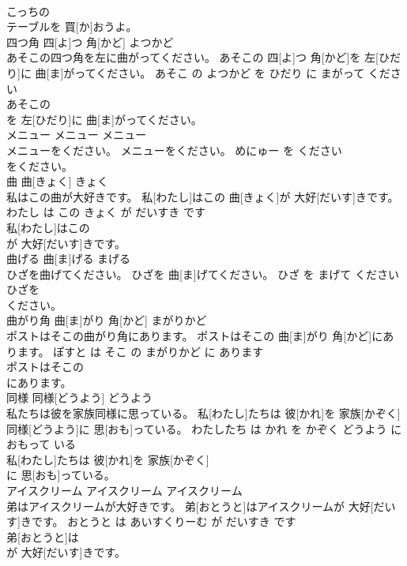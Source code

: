 \documentclass[8pt]{extreport}
\begin{document}
\begin{CJK}{UTF8}{min}
\\	こっちの
\\	テーブルを 買[か]おうよ。			
\\	四つ角	四[よ]つ 角[かど]	よつかど	
\\	あそこの四つ角を左に曲がってください。	あそこの 四[よ]つ 角[かど]を 左[ひだり]に 曲[ま]がってください。	あそこ の よつかど を ひだり に まがって ください	
\\	あそこの
\\	を 左[ひだり]に 曲[ま]がってください。			
\\	メニュー	メニュー	メニュー	
\\	メニューをください。	メニューをください。	めにゅー を ください	
\\	をください。			
\\	曲	曲[きょく]	きょく	
\\	私はこの曲が大好きです。	私[わたし]はこの 曲[きょく]が 大好[だいす]きです。	わたし は この きょく が だいすき です	
\\	私[わたし]はこの
\\	が 大好[だいす]きです。			
\\	曲げる	曲[ま]げる	まげる	
\\	ひざを曲げてください。	ひざを 曲[ま]げてください。	ひざ を まげて ください	
\\	ひざを
\\	ください。			
\\	曲がり角	曲[ま]がり 角[かど]	まがりかど	
\\	ポストはそこの曲がり角にあります。	ポストはそこの 曲[ま]がり 角[かど]にあります。	ぽすと は そこ の まがりかど に あります	
\\	ポストはそこの
\\	にあります。			
\\	同様	同様[どうよう]	どうよう	
\\	私たちは彼を家族同様に思っている。	私[わたし]たちは 彼[かれ]を 家族[かぞく] 同様[どうよう]に 思[おも]っている。	わたしたち は かれ を かぞく どうよう に おもって いる	
\\	私[わたし]たちは 彼[かれ]を 家族[かぞく]
\\	に 思[おも]っている。			
\\	アイスクリーム	アイスクリーム	アイスクリーム	
\\	弟はアイスクリームが大好きです。	弟[おとうと]はアイスクリームが 大好[だいす]きです。	おとうと は あいすくりーむ が だいすき です	
\\	弟[おとうと]は
\\	が 大好[だいす]きです。			

\end{CJK}
\end{document}

